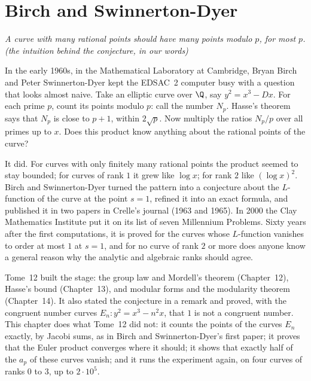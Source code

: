 \chapter{Birch and Swinnerton-Dyer}\label{ch:bsd}

\begin{center}\itshape
A curve with many rational points should have many points modulo $p$, for most $p$.\\
\upshape(the intuition behind the conjecture, in our words)
\end{center}

In the early 1960s, in the Mathematical Laboratory at Cambridge, Bryan Birch and Peter Swinnerton-Dyer kept the EDSAC~2 computer busy with a question that
looks almost naive. Take an elliptic curve over $\Q$, say $y^2=x^3-Dx$. For each prime $p$, count its points modulo $p$: call the number $N_p$. Hasse's theorem
says that $N_p$ is close to $p+1$, within $2\sqrt p$. Now multiply the ratios $N_p/p$ over all primes up to $x$. Does this product know anything about the
rational points of the curve?

It did. For curves with only finitely many rational points the product seemed to stay bounded; for curves of rank $1$ it grew like $\log x$; for rank $2$ like
$(\log x)^2$. Birch and Swinnerton-Dyer turned the pattern into a conjecture about the $L$-function of the curve at the point $s=1$, refined it into an exact
formula, and published it in two papers in Crelle's journal (1963 and 1965). In 2000 the Clay Mathematics Institute put it on its list of seven Millennium
Problems. Sixty years after the first computations, it is proved for the curves whose $L$-function vanishes to order at most $1$ at $s=1$, and for no curve of rank $2$ or more
does anyone know a general reason why the analytic and algebraic ranks should agree.

Tome~12 built the stage: the group law and Mordell's theorem (Chapter~12), Hasse's bound (Chapter~13), and modular forms and the modularity theorem
(Chapter~14). It also stated the conjecture in a remark and proved, with the congruent number curves $E_n:y^2=x^3-n^2x$, that $1$ is not a congruent number.
This chapter does what Tome~12 did not: it counts the points of the curves $E_n$ exactly, by Jacobi sums, as in Birch and Swinnerton-Dyer's first paper; it
proves that the Euler product converges where it should; it shows that exactly half of the $a_p$ of these curves vanish; and it runs the experiment again,
on four curves of ranks $0$ to $3$, up to $2\cdot10^5$.

